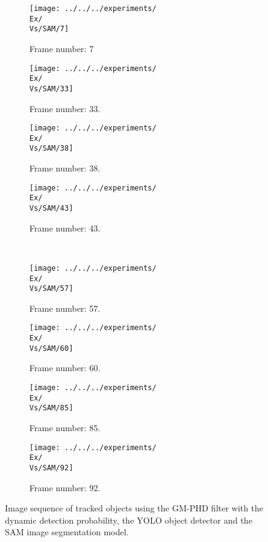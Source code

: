 \begin{figure}[H]
    \centering
    \begin{subfigure}{0.23\textwidth}
        \centering
        \texttt{[image: ../../../experiments/\\Ex/\\Vs/SAM/7]}
        \caption{Frame number: 7}
        \label{fig:\Ex-\Vs-\Set:01}
    \end{subfigure}
    \begin{subfigure}{0.23\textwidth}
        \centering
        \texttt{[image: ../../../experiments/\\Ex/\\Vs/SAM/33]}
        \caption{Frame number: 33.}
        \label{fig:\Ex-\Vs-\Set:02}
    \end{subfigure}
    \begin{subfigure}{0.23\textwidth}
        \centering
        \texttt{[image: ../../../experiments/\\Ex/\\Vs/SAM/38]}
        \caption{Frame number: 38.}
        \label{fig:\Ex-\Vs-\Set:03}
    \end{subfigure}
    \begin{subfigure}{0.23\textwidth}
        \centering
        \texttt{[image: ../../../experiments/\\Ex/\\Vs/SAM/43]}
        \caption{Frame number: 43.}
        \label{fig:\Ex-\Vs-\Set:04}
    \end{subfigure}
    \\
    \begin{subfigure}{0.23\textwidth}
        \centering
        \texttt{[image: ../../../experiments/\\Ex/\\Vs/SAM/57]}
        \caption{Frame number: 57.}
        \label{fig:\Ex-\Vs-\Set:05}
    \end{subfigure}
    \begin{subfigure}{0.23\textwidth}
        \centering
        \texttt{[image: ../../../experiments/\\Ex/\\Vs/SAM/60]}
        \caption{Frame number: 60.}
        \label{fig:\Ex-\Vs-\Set:06}
    \end{subfigure}
    \begin{subfigure}{0.23\textwidth}
        \centering
        \texttt{[image: ../../../experiments/\\Ex/\\Vs/SAM/85]}
        \caption{Frame number: 85.}
        \label{fig:\Ex-\Vs-\Set:07}
    \end{subfigure}
    \begin{subfigure}{0.23\textwidth}
        \centering
        \texttt{[image: ../../../experiments/\\Ex/\\Vs/SAM/92]}
        \caption{Frame number: 92.}
        \label{fig:\Ex-\Vs-\Set:08}
    \end{subfigure}
    \caption{Image sequence of tracked objects using the GM-PHD filter with the dynamic detection probability, the YOLO
    object detector and the SAM image segmentation model.}
    \label{fig:\Ex-\Vs-\Set}
\end{figure}


